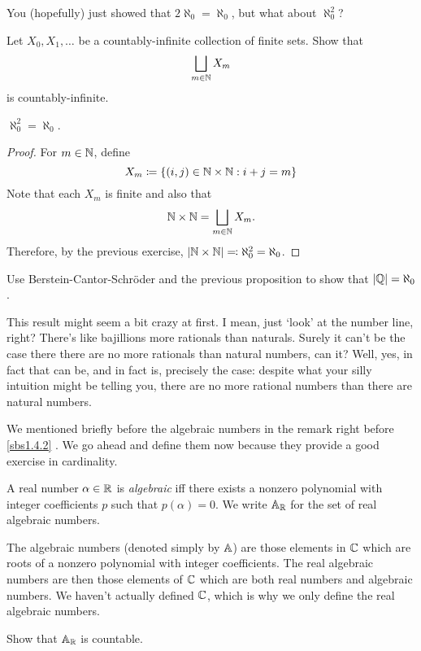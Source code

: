 You (hopefully) just showed that $2\aleph _0=\aleph _0$, but what about $\aleph _0^2$?
\begin{exr}
Let $X_0,X_1,\ldots $ be a countably-infinite collection of finite sets.  Show that
\begin{equation}
\bigsqcup _{m\in \mathbb{N}}X_m
\end{equation}
is countably-infinite.
\end{exr}
\begin{prp}
$\aleph _0^2=\aleph _0$.
\begin{proof}
For $m\in \mathbb{N}$, define
\begin{equation}
X_m\coloneqq \left\{ (i,j)\in \mathbb{N} \times \mathbb{N}:i+j=m\right\} 
\end{equation}
Note that each $X_m$ is finite and also that
\begin{equation}
\mathbb{N} \times \mathbb{N} =\bigsqcup _{m\in \mathbb{N}}X_m.
\end{equation}
Therefore, by the previous exercise, $|\mathbb{N} \times \mathbb{N} |\eqqcolon \aleph _0^2=\aleph _0$.
\end{proof}
\end{prp}
\begin{exr}
Use Berstein-Cantor-Schr\"{o}der and the previous proposition to show that $|\mathbb{Q} |=\aleph _0$.
\end{exr}
This result might seem a bit crazy at first.  I mean, just `look' at the number line, right?  There's like bajillions more rationals than naturals.  Surely it can't be the case there there are no more rationals than natural numbers, can it?  Well, yes, in fact that can be, and in fact is, precisely the case:  despite what your silly intuition might be telling you, there are no more rational numbers than there are natural numbers.

We mentioned briefly before the algebraic numbers in the remark right before \cref{sbs1.4.2} .  We go ahead and define them now because they provide a good exercise in cardinality.
\begin{dfn}\label{dfn2.13}
A real number $\alpha \in \mathbb{R}$ is \emph{algebraic} iff there exists a nonzero polynomial with integer coefficients $p$ such that $p(\alpha )=0$.  We write $\A _\R$\index[notation]{$\A _\R$} for the set of real algebraic numbers.
\begin{rmk}
The algebraic numbers (denoted simply by $\A$\index[notation]{$\A$}) are those elements in $\mathbb{C}$ which are roots of a nonzero polynomial with integer coefficients.  The real algebraic numbers are then those elements of $\mathbb{C}$ which are both real numbers and algebraic numbers.  We haven't actually defined $\mathbb{C}$, which is why we only define the real algebraic numbers.
\end{rmk}
\end{dfn}
\begin{exr}
Show that $\A _\R$ is countable.
\end{exr}

